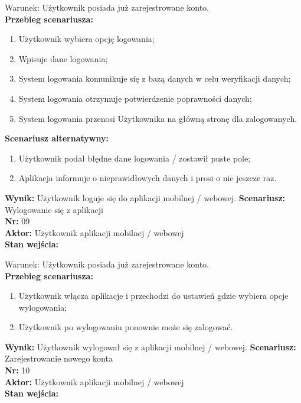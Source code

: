 \documentclass[12pt,a4paper]{article}
\begin{document}
Warunek: Użytkownik posiada już zarejestrowane konto.
\\{\bf Przebieg scenariusza:}
\begin{enumerate}
\item Użytkownik wybiera opcję logowania;
\item Wpisuje dane logowania;
\item System logowania komunikuje się z bazą danych w celu weryfikacji danych;
\item System logowania otrzymuje potwierdzenie poprawności danych;
\item System logowania przenosi Użytkownika na główną stronę dla zalogowanych.
\end{enumerate}
{\bf Scenariusz alternatywny:}
\begin{enumerate}
\item Użytkownik podał błędne dane logowania / zostawił puste pole;
\item Aplikacja informuje o nieprawidłowych danych i prosi o nie jeszcze raz.
\end{enumerate}
{\bf Wynik:} Użytkownik loguje się do aplikacji mobilnej / webowej.
\newline\newline
{\large \bf Scenariusz:} Wylogowanie się z aplikacji
\\{\bf Nr:} 09
\\{\bf Aktor:} Użytkownik aplikacji mobilnej / webowej
\\{\bf Stan wejścia:}

Warunek: Użytkownik posiada już zarejestrowane konto.
\\{\bf Przebieg scenariusza:}
\begin{enumerate}
\item Użytkownik włącza aplikacje i przechodzi do ustawień gdzie wybiera opcje wylogowania;
\item Użytkownik po wylogowaniu ponownie może się zalogować.
\end{enumerate}
{\bf Wynik:} Użytkownik wylogował się z aplikacji mobilnej / webowej.
\newline\newline\newline\newline\newline\newline\newline\newline\newline\newline\newline\newline\newline\newline
{\large \bf Scenariusz:} Zarejestrowanie nowego konta
\\{\bf Nr:} 10
\\{\bf Aktor:} Użytkownik aplikacji mobilnej / webowej
\\{\bf Stan wejścia:}
\end{document}

